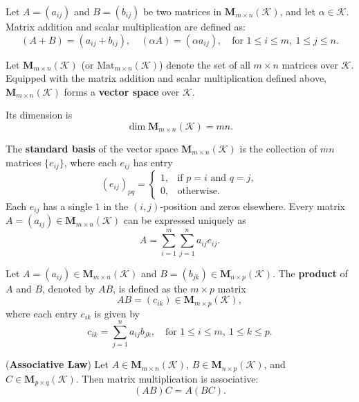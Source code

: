 \documentclass{ctexart}
\begin{document}
	\begin{mydef}
		Let $A = (a_{ij})$ and $B = (b_{ij})$ be two matrices in $\mathbf{M}_{m \times n}(\mathcal{K})$, and let $\alpha \in \mathcal{K}$.  
		Matrix addition and scalar multiplication are defined as:
		\[
		(A + B) = (a_{ij} + b_{ij}), \quad
		(\alpha A) = (\alpha a_{ij}), \quad
		\text{for } 1 \leq i \leq m, \ 1 \leq j \leq n.
		\]
	\end{mydef}
	
	\begin{myrmk}
		Let $\mathbf{M}_{m \times n}(\mathcal{K})$ (or $\mathrm{Mat}_{m \times n}(\mathcal{K})$) denote the set of all $m \times n$ matrices over $\mathcal{K}$.  
		Equipped with the matrix addition and scalar multiplication defined above,  
		$\mathbf{M}_{m \times n}(\mathcal{K})$ forms a \textbf{vector space} over $\mathcal{K}$.
		
		Its dimension is
		\[
		\dim \mathbf{M}_{m \times n}(\mathcal{K}) = m n.
		\]
	\end{myrmk}
	
	\begin{mydef}
		The \textbf{standard basis} of the vector space $\mathbf{M}_{m \times n}(\mathcal{K})$  
		is the collection of $m n$ matrices $\{e_{ij}\}$, where each $e_{ij}$ has entry
		\[
		(e_{ij})_{pq} =
		\begin{cases}
			1, & \text{if } p = i \text{ and } q = j,\\
			0, & \text{otherwise}.
		\end{cases}
		\]
		Each $e_{ij}$ has a single $1$ in the $(i,j)$-position and zeros elsewhere.  
		Every matrix $A = (a_{ij}) \in \mathbf{M}_{m \times n}(\mathcal{K})$ can be expressed uniquely as
		\[
		A = \sum_{i=1}^{m} \sum_{j=1}^{n} a_{ij} e_{ij}.
		\]
	\end{mydef}
	
	\begin{mydef}
		Let $A = (a_{ij}) \in \mathbf{M}_{m \times n}(\mathcal{K})$ and 
		$B = (b_{jk}) \in \mathbf{M}_{n \times p}(\mathcal{K})$.  
		The \textbf{product} of $A$ and $B$, denoted by $AB$, is defined as the $m \times p$ matrix
		\[
		AB = (c_{ik}) \in \mathbf{M}_{m \times p}(\mathcal{K}),
		\]
		where each entry $c_{ik}$ is given by
		\[
		c_{ik} = \sum_{j=1}^{n} a_{ij} b_{jk},
		\quad \text{for } 1 \leq i \leq m, \ 1 \leq k \leq p.
		\]
	\end{mydef}
	
	\begin{mythm}
		(\textbf{Associative Law})  
		Let $A \in \mathbf{M}_{m \times n}(\mathcal{K})$, 
		$B \in \mathbf{M}_{n \times p}(\mathcal{K})$, 
		and $C \in \mathbf{M}_{p \times q}(\mathcal{K})$.  
		Then matrix multiplication is associative:
		\[
		(AB)C = A(BC).
		\]
	\end{mythm}
	
\end{document}
